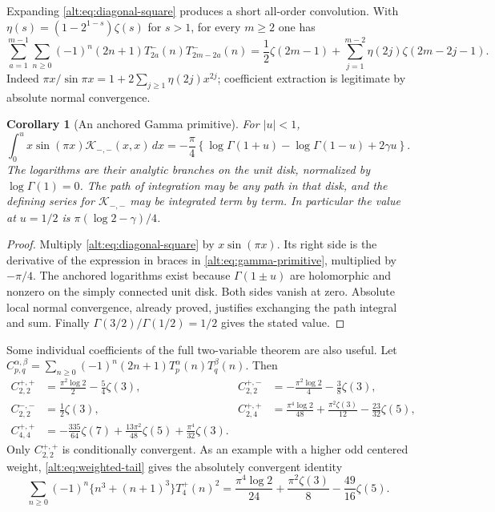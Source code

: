 \documentclass[11pt]{article}
\newtheorem{corollary}[theorem]{Corollary}
\theoremstyle{definition}
\theoremstyle{remark}
\numberwithin{equation}{section}
\begin{document}
Expanding \eqref{alt:eq:diagonal-square} produces a short all-order
convolution. With $\eta(s)=(1-2^{1-s})\zeta(s)$ for $s>1$, for every
$m\ge2$ one has
\begin{equation}\label{alt:eq:convolution}
 \sum_{a=1}^{m-1}\sum_{n\ge0}(-1)^n(2n+1)
        T_{2a}^-(n)T_{2m-2a}^-(n)
 =\frac12\zeta(2m-1)
   +\sum_{j=1}^{m-2}\eta(2j)\zeta(2m-2j-1).
\end{equation}
Indeed
$\pi x/\sin\pi x=1+2\sum_{j\ge1}\eta(2j)x^{2j}$;
coefficient extraction is legitimate by absolute normal convergence.

\begin{corollary}[An anchored Gamma primitive]
\label{alt:cor:gamma-primitive}
For $|u|<1$,
\begin{equation}\label{alt:eq:gamma-primitive}
 \int_0^u x\sin(\pi x)\mathcal K_{-,-}(x,x)\,dx
 =-\frac\pi4\left\{
 \log\Gamma(1+u)-\log\Gamma(1-u)+2\gamma u\right\}.
\end{equation}
The logarithms are their analytic branches on the unit disk,
normalized by $\log\Gamma(1)=0$. The path of integration may be any
path in that disk, and the defining series for $\mathcal K_{-,-}$
may be integrated term by term. In particular the value at $u=1/2$
is $\pi(\log2-\gamma)/4$.
\end{corollary}
\begin{proof}
Multiply \eqref{alt:eq:diagonal-square} by $x\sin(\pi x)$.
Its right side is the derivative of the expression in braces
in \eqref{alt:eq:gamma-primitive}, multiplied by $-\pi/4$.
The anchored logarithms exist because $\Gamma(1\pm u)$ are
holomorphic and nonzero on the simply connected unit disk.
Both sides vanish at zero. Absolute local normal convergence,
already proved, justifies exchanging the path integral and sum.
Finally $\Gamma(3/2)/\Gamma(1/2)=1/2$ gives the stated value.
\end{proof}

Some individual coefficients of the full two-variable theorem are
also useful. Let
$C_{p,q}^{\alpha,\beta}=\sum_{n\ge0}(-1)^n(2n+1)
T_p^\alpha(n)T_q^\beta(n)$. Then
\begin{align}
 C_{2,2}^{+,+}&=\frac{\pi^2\log2}{2}-\frac54\zeta(3),
 & C_{2,2}^{+,-}&=-\frac{\pi^2\log2}{4}-\frac38\zeta(3),
 \label{alt:eq:coeff22}\\
 C_{2,2}^{-,-}&=\frac12\zeta(3),
 &C_{2,4}^{+,+}&=\frac{\pi^4\log2}{48}
                   +\frac{\pi^2\zeta(3)}{12}-\frac{23}{32}\zeta(5),
 \label{alt:eq:coeff24}\\
 C_{4,4}^{+,+}&=-\frac{335}{64}\zeta(7)
                 +\frac{13\pi^2}{48}\zeta(5)
                 +\frac{\pi^4}{32}\zeta(3).
 \label{alt:eq:coeff44}
\end{align}
Only $C_{2,2}^{+,+}$ is conditionally convergent. As an example with a
higher odd centered weight, \eqref{alt:eq:weighted-tail} gives the
absolutely convergent identity
\begin{equation}\label{alt:eq:cubicweight}
 \sum_{n\ge0}(-1)^n\{n^3+(n+1)^3\}T_4^+(n)^2
 =\frac{\pi^4\log2}{24}+\frac{\pi^2\zeta(3)}8
       -\frac{49}{16}\zeta(5).
\end{equation}
\end{document}
